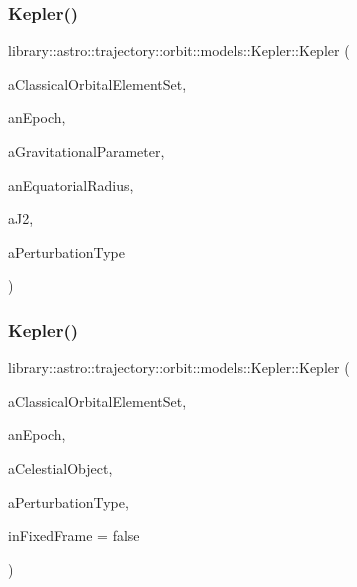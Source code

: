 \subsubsection{\texorpdfstring{Kepler()}{Kepler()}\hspace{0.1cm}{\footnotesize\ttfamily [1/2]}}
{\footnotesize\ttfamily library\+::astro\+::trajectory\+::orbit\+::models\+::\+Kepler\+::\+Kepler (\begin{DoxyParamCaption}\item[{const \hyperlink{classlibrary_1_1astro_1_1trajectory_1_1orbit_1_1models_1_1kepler_1_1_c_o_e}{C\+OE} \&}]{a\+Classical\+Orbital\+Element\+Set,  }\item[{const Instant \&}]{an\+Epoch,  }\item[{const Derived \&}]{a\+Gravitational\+Parameter,  }\item[{const Length \&}]{an\+Equatorial\+Radius,  }\item[{const Real \&}]{a\+J2,  }\item[{const \hyperlink{classlibrary_1_1astro_1_1trajectory_1_1orbit_1_1models_1_1_kepler_a7f34995d6f287de65a6edb2d419a2fe0}{Kepler\+::\+Perturbation\+Type} \&}]{a\+Perturbation\+Type }\end{DoxyParamCaption})}

\mbox{\label{classlibrary_1_1astro_1_1trajectory_1_1orbit_1_1models_1_1_kepler_a07fe8f18505ab866ba777fc37e8390a3}} 
\subsubsection{\texorpdfstring{Kepler()}{Kepler()}\hspace{0.1cm}{\footnotesize\ttfamily [2/2]}}
{\footnotesize\ttfamily library\+::astro\+::trajectory\+::orbit\+::models\+::\+Kepler\+::\+Kepler (\begin{DoxyParamCaption}\item[{const \hyperlink{classlibrary_1_1astro_1_1trajectory_1_1orbit_1_1models_1_1kepler_1_1_c_o_e}{C\+OE} \&}]{a\+Classical\+Orbital\+Element\+Set,  }\item[{const Instant \&}]{an\+Epoch,  }\item[{const Celestial \&}]{a\+Celestial\+Object,  }\item[{const \hyperlink{classlibrary_1_1astro_1_1trajectory_1_1orbit_1_1models_1_1_kepler_a7f34995d6f287de65a6edb2d419a2fe0}{Kepler\+::\+Perturbation\+Type} \&}]{a\+Perturbation\+Type,  }\item[{const bool}]{in\+Fixed\+Frame = {\ttfamily false} }\end{DoxyParamCaption})}



